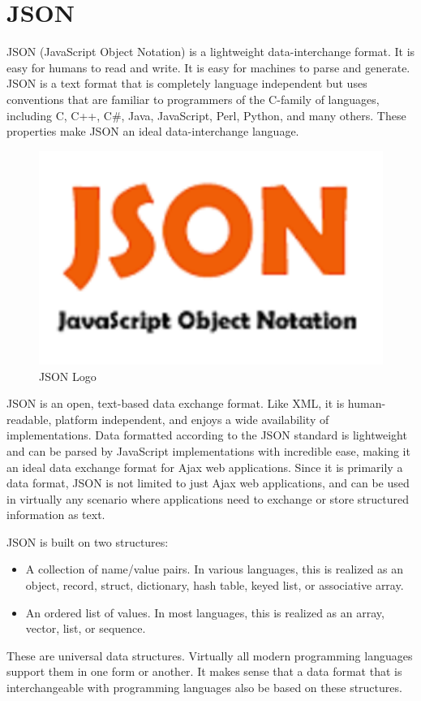 \section{JSON}

JSON (JavaScript Object Notation) is a lightweight data-interchange format. It is easy for humans to read and write. It is easy for machines to parse and generate. JSON is a text format that is completely language independent but uses conventions that are familiar to programmers of the C-family of languages, including C, C++, C\#, Java, JavaScript, Perl, Python, and many others. These properties make JSON an ideal data-interchange language.
\begin{figure}[H]
	\centering \includegraphics[scale=0.3]{images/json.png}
	\caption{JSON Logo}
\end{figure}
JSON is an open, text-based data exchange format. Like XML, it is human-readable, platform independent, and enjoys a wide availability of implementations. Data formatted according to the JSON standard is lightweight and can be parsed by JavaScript implementations with incredible ease, making it an ideal data exchange format for Ajax web applications. Since it is primarily a data format, JSON is not limited to just Ajax web applications, and can be used in virtually any scenario where applications need to exchange or store structured information as text.

JSON is built on two structures:

\begin{itemize}
	\item A collection of name/value pairs. In various languages, this is realized as an object, record, struct, dictionary, hash table, keyed list, or associative array.
	\item An ordered list of values. In most languages, this is realized as an array, vector, list, or sequence.
\end{itemize}

These are universal data structures. Virtually all modern programming languages support them in one form or another. It makes sense that a data format that is interchangeable with programming languages also be based on these structures.
